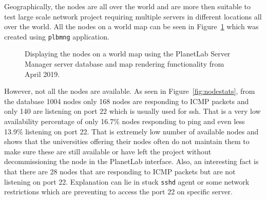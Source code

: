 {{{{{{{Geographically, the nodes are all over the world and are more then suitable to test large scale network project requiring multiple servers in different locations all over the world. All the nodes on a world map can be seen in Figure~\ref{fig:allnodes} which was created using \texttt{plbmng} application.

\begin{figure}[H]
	\centering
	\caption{Displaying the nodes on a world map using the PlanetLab Server Manager server database and map rendering functionality from April 2019.}
	\label{fig:allnodes}
\end{figure}

However, not all the nodes are available. As seen in Figure~\ref{fig:nodestats}, from the database 1004 nodes only 168 nodes are responding to ICMP packets and only 140 are listening on port 22 which is usually used for ssh. That is a very low availability percentage of only 16.7\% nodes responding to ping and even less 13.9\% listening on port 22. That is extremely low number of available nodes and shows that the universities offering their nodes often do not maintain them to make sure these are still available or have left the project without decommissioning the node in the PlanetLab interface. Also, an interesting fact is that there are 28 nodes that are responding to ICMP packets but are not listening on port 22. Explanation can lie in stuck \texttt{sshd} agent or some network restrictions which are preventing to access the port 22 on specific server.

}}}}}}}
